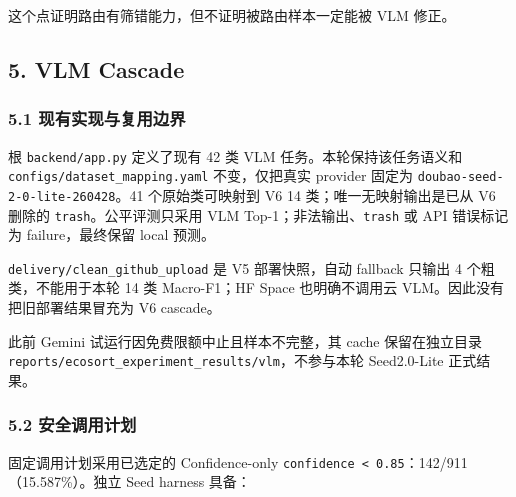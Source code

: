 \documentclass[
  a4paper,
]{article}
\begin{document}
这个点证明路由有筛错能力，但不证明被路由样本一定能被 VLM 修正。

\hypertarget{5-vlm-cascade}{%
\subsection{5. VLM Cascade}\label{5-vlm-cascade}}

\hypertarget{51-ux73b0ux6709ux5b9eux73b0ux4e0eux590dux7528ux8fb9ux754c}{%
\subsubsection{5.1
现有实现与复用边界}\label{51-ux73b0ux6709ux5b9eux73b0ux4e0eux590dux7528ux8fb9ux754c}}

根 \texttt{backend/app.py} 定义了现有 42 类 VLM
任务。本轮保持该任务语义和 \texttt{configs/dataset\_mapping.yaml}
不变，仅把真实 provider 固定为 \texttt{doubao-seed-2-0-lite-260428}。41
个原始类可映射到 V6 14 类；唯一无映射输出是已从 V6 删除的
\texttt{trash}。公平评测只采用 VLM Top-1；非法输出、\texttt{trash} 或
API 错误标记为 failure，最终保留 local 预测。

\texttt{delivery/clean\_github\_upload} 是 V5 部署快照，自动 fallback
只输出 4 个粗类，不能用于本轮 14 类 Macro-F1；HF Space 也明确不调用云
VLM。因此没有把旧部署结果冒充为 V6 cascade。

此前 Gemini 试运行因免费限额中止且样本不完整，其 cache 保留在独立目录
\texttt{reports/ecosort\_experiment\_results/vlm}，不参与本轮
Seed2.0-Lite 正式结果。

\hypertarget{52-ux5b89ux5168ux8c03ux7528ux8ba1ux5212}{%
\subsubsection{5.2
安全调用计划}\label{52-ux5b89ux5168ux8c03ux7528ux8ba1ux5212}}

固定调用计划采用已选定的 Confidence-only
\texttt{confidence\ \textless{}\ 0.85}：142/911（15.587\%）。独立 Seed
harness 具备：
\end{document}
